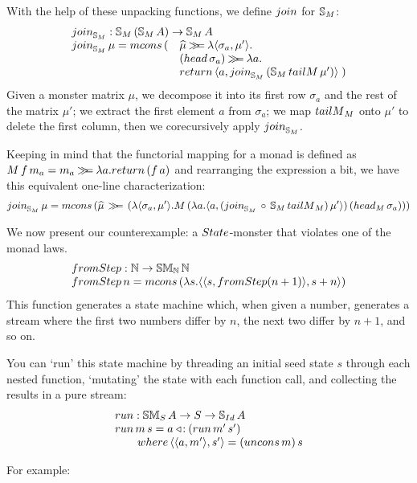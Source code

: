 With the help of these unpacking functions, we define $\join$ for ${\mathbb{S}_{M}}$:
$$
\begin{array}{ll}
\multicolumn{2}{l}{\join_{\stream{M}}: \stream{M}\,(\stream{M}\,A) \rightarrow \stream{M}\,A}\\
\join_{\stream{M}}\,\mu = \mcons\,(
  & \unc{\mu} \bind
    \lambda \pair{\sigma_a}{\mu'}.\\
  &  (\head\,\sigma_a) \bind \lambda a.\\
  & \return\,\pair{a}{\join_{\stream{M}}\,(\stream{M}\,\tailm\, \mu')} \; )
\end{array}
$$
Given a monster matrix $\mu$, we decompose it into its first row $\sigma_a$ and the rest of the matrix $\mu'$; 
we extract the first element $a$ from $\sigma_a$;
we map $\tailm_M$ onto $\mu'$ to delete the first column, then we corecursively apply $\join_{\stream{M}}$.

Keeping in mind that the functorial mapping for a monad is defined as $M\,f\,m_a = m_a \bind \lambda a. \return\,(f\,a)$ and rearranging the expression a bit, we have this equivalent one-line characterization:
$$
\join_{\stream{M}}\, \mu = \mcons\, (\unc{\mu} \, \bind \,(\lambda \pair{\sigma_a}{\mu'} . M\,(\lambda a . \pair{a}{(\join_{\stream{M}}\, \comp\, \stream{M}\,\tailm_M)\, \mu'})\, (\head_M\, \sigma_a)))
$$

We now present our counterexample: a $\state$-monster that violates one of the monad laws.
$$
\begin{array}{l}
\fromstepstr : \nat \rightarrow \stmon{\nat}\,\nat \\
\fromstepstr\, n = \mcons\, (\lambda s. \pair{\pair{s}{\fromstepstr (n + 1)}}{s + n})
\end{array}
$$
This function generates a state machine which, when given a number, generates a stream where the first two numbers differ by $n$, the next two differ by $n + 1$, and so on.

You can `run' this state machine by threading an initial seed state $s$ through each nested function, `mutating' the state with each function call, and collecting the results in a pure stream:
$$
\begin{array}{l}
\strun : \stmon{S}\,A \rightarrow S \rightarrow \stream{\Id}\,A  \\
\strun\, m\, s = a \acons (\strun\,m'\,s')  \\
\qquad\where\,\pair{\pair{a}{m'}}{s'} = (\uncons\,m)\, s
\end{array}
$$

For example:


